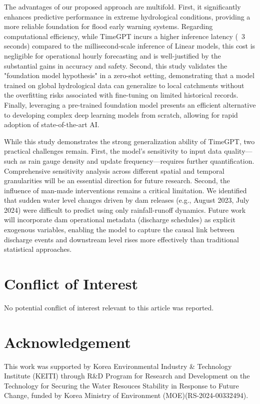 \documentclass[a4paper,twoside,flushend, 10pt]{article}
\begin{document}
The advantages of our proposed approach are multifold. First, it significantly enhances predictive performance in extreme hydrological conditions, providing a more reliable foundation for flood early warning systems. Regarding computational efficiency, while TimeGPT incurs a higher inference latency (~3 seconds) compared to the millisecond-scale inference of Linear models, this cost is negligible for operational hourly forecasting and is well-justified by the substantial gains in accuracy and safety. Second, this study validates the "foundation model hypothesis" in a zero-shot setting, demonstrating that a model trained on global hydrological data can generalize to local catchments without the overfitting risks associated with fine-tuning on limited historical records. Finally, leveraging a pre-trained foundation model presents an efficient alternative to developing complex deep learning models from scratch, allowing for rapid adoption of state-of-the-art AI.

While this study demonstrates the strong generalization ability of TimeGPT, two practical challenges remain. First, the model’s sensitivity to input data quality—such as rain gauge density and update frequency—requires further quantification. Comprehensive sensitivity analysis across different spatial and temporal granularities will be an essential direction for future research. Second, the influence of man-made interventions remains a critical limitation. We identified that sudden water level changes driven by dam releases (e.g., August 2023, July 2024) were difficult to predict using only rainfall-runoff dynamics. Future work will incorporate dam operational metadata (discharge schedules) as explicit exogenous variables, enabling the model to capture the causal link between discharge events and downstream level rises more effectively than traditional statistical approaches.

\medskip
\section*{Conflict of Interest}
\noindent
No potential conflict of interest relevant to this article was reported.

\medskip
\section*{Acknowledgement}
\noindent
This work was supported by Korea Environmental Industry \& Technology Institute (KEITI) through R\&D Program for Research and Development on the Technology for Securing the Water Resouces Stability in Response to Future Change, funded by Korea Ministry of Environment (MOE)(RS-2024-00332494).
\end{document}
